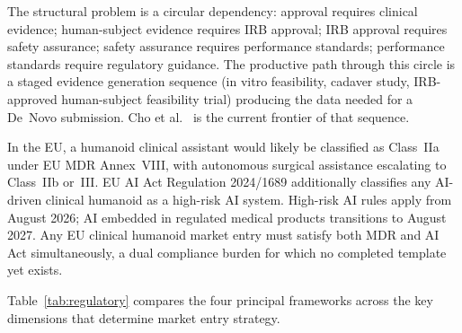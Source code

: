 \documentclass[acmjour]{acmart}
\begin{document}
The structural problem is a circular dependency: approval requires clinical
evidence; human-subject evidence requires IRB approval; IRB approval requires
safety assurance; safety assurance requires performance standards; performance
standards require regulatory guidance. The productive path through this circle is
a staged evidence generation sequence (in vitro feasibility, cadaver study,
IRB-approved human-subject feasibility trial) producing the data needed for a
De~Novo submission. Cho et al.~\cite{cho2026humanoid} is the current frontier of
that sequence.

In the EU, a humanoid clinical assistant would likely be classified as Class~IIa
under EU MDR Annex~VIII, with autonomous surgical assistance escalating to
Class~IIb or~III. EU AI Act Regulation 2024/1689 additionally classifies any
AI-driven clinical humanoid as a high-risk AI system. High-risk AI rules apply
from August 2026; AI embedded in regulated medical products transitions to August
2027. Any EU clinical humanoid market entry must satisfy both MDR and AI Act
simultaneously, a dual compliance burden for which no completed template yet
exists.

Table~\ref{tab:regulatory} compares the four principal frameworks across the key
dimensions that determine market entry strategy.
\end{document}
